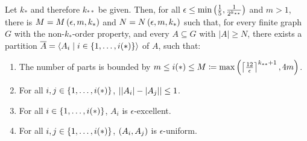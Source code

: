     \theorem[Theorem 5.18]\label{minimal_conditions_for_excellent_partitions}
        Let $k_*$ and therefore $k_{**}$ be given.
        Then, for all $\epsilon \leq \min \left( \frac{1}{5}, \frac{1}{2^{k_{**}}} \right)$ and $m > 1$, there is $M = M\left( \epsilon, m, k_* \right)$
        and $N = N\left( \epsilon, m, k_* \right)$ such that, for every finite graph $G$ with the non-$k_{*}$-order property, and
        every $A \subseteq G$ with $|A| \geq N$, there exists a partition $\overline{A} = \left< A_i \mid i \in \left\{ 1, \dots, i(*) \right\} \right>$
        of $A$, such that:
        \begin{enumerate}
            \item \label{itm:5.18.0} The number of parts is bounded by
                $m \leq i(*) \leq M \coloneqq \max \left( \left\lceil \frac{12}{\epsilon} \right\rceil^{k_{**}+1}, 4m \right)$. 
            \item \label{itm:5.18.1} For all $i, j \in \left\{ 1, \dots, i(*) \right\}$, $\left| \left| A_i \right|- \left| A_j \right| \right| \leq 1$.
            \item \label{itm:5.18.2} For all $i \in \left\{ 1, \dots, i(*) \right\}$, $A_i$ is $\epsilon$-excellent.
            \item \label{itm:5.18.3} For all $i, j \in \left\{ 1, \dots, i(*) \right\}$, $\left( A_i, A_j \right)$ is $\epsilon$-uniform.  
        \end{enumerate}
